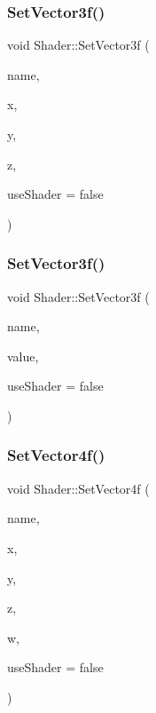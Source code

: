 \mbox{\label{class_shader_ad7e3033cb0250e83bc118c0677ef678a}} 
\subsubsection{\texorpdfstring{SetVector3f()}{SetVector3f()}\hspace{0.1cm}{\footnotesize\ttfamily [1/2]}}
{\footnotesize\ttfamily void Shader\+::\+Set\+Vector3f (\begin{DoxyParamCaption}\item[{const G\+Lchar $\ast$}]{name,  }\item[{G\+Lfloat}]{x,  }\item[{G\+Lfloat}]{y,  }\item[{G\+Lfloat}]{z,  }\item[{G\+Lboolean}]{use\+Shader = {\ttfamily false} }\end{DoxyParamCaption})}

\mbox{\label{class_shader_af564b9fd25379dafacba930fc414dae8}} 
\subsubsection{\texorpdfstring{SetVector3f()}{SetVector3f()}\hspace{0.1cm}{\footnotesize\ttfamily [2/2]}}
{\footnotesize\ttfamily void Shader\+::\+Set\+Vector3f (\begin{DoxyParamCaption}\item[{const G\+Lchar $\ast$}]{name,  }\item[{const glm\+::vec3 \&}]{value,  }\item[{G\+Lboolean}]{use\+Shader = {\ttfamily false} }\end{DoxyParamCaption})}

\mbox{\label{class_shader_a9f0f5bf4f960f299e6d7f69ecc612474}} 
\subsubsection{\texorpdfstring{SetVector4f()}{SetVector4f()}\hspace{0.1cm}{\footnotesize\ttfamily [1/2]}}
{\footnotesize\ttfamily void Shader\+::\+Set\+Vector4f (\begin{DoxyParamCaption}\item[{const G\+Lchar $\ast$}]{name,  }\item[{G\+Lfloat}]{x,  }\item[{G\+Lfloat}]{y,  }\item[{G\+Lfloat}]{z,  }\item[{G\+Lfloat}]{w,  }\item[{G\+Lboolean}]{use\+Shader = {\ttfamily false} }\end{DoxyParamCaption})}

